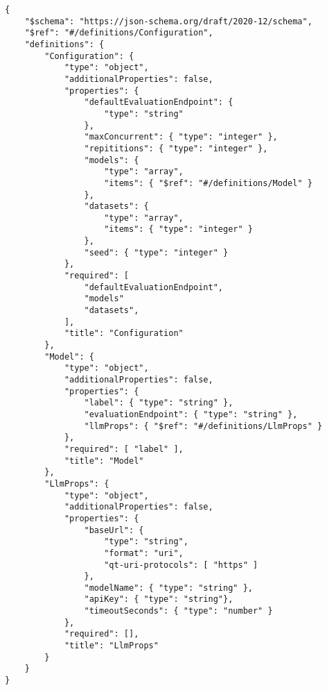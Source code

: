 \begin{lstlisting}[caption={Schema der YAML-Evaluationskonfiguration},label={lst:evaluation-config-schema}]
{
    "$schema": "https://json-schema.org/draft/2020-12/schema",
    "$ref": "#/definitions/Configuration",
    "definitions": {
        "Configuration": {
            "type": "object",
            "additionalProperties": false,
            "properties": {
                "defaultEvaluationEndpoint": {
                    "type": "string"
                },
                "maxConcurrent": { "type": "integer" },
                "repititions": { "type": "integer" },
                "models": {
                    "type": "array",
                    "items": { "$ref": "#/definitions/Model" }
                },
                "datasets": {
                    "type": "array",
                    "items": { "type": "integer" }
                },
                "seed": { "type": "integer" }
            },
            "required": [
                "defaultEvaluationEndpoint",
                "models"
                "datasets",
            ],
            "title": "Configuration"
        },
        "Model": {
            "type": "object",
            "additionalProperties": false,
            "properties": {
                "label": { "type": "string" },
                "evaluationEndpoint": { "type": "string" },
                "llmProps": { "$ref": "#/definitions/LlmProps" }
            },
            "required": [ "label" ],
            "title": "Model"
        },
        "LlmProps": {
            "type": "object",
            "additionalProperties": false,
            "properties": {
                "baseUrl": {
                    "type": "string",
                    "format": "uri",
                    "qt-uri-protocols": [ "https" ]
                },
                "modelName": { "type": "string" },
                "apiKey": { "type": "string"},
                "timeoutSeconds": { "type": "number" }
            },
            "required": [],
            "title": "LlmProps"
        }
    }
}
\end{lstlisting}

